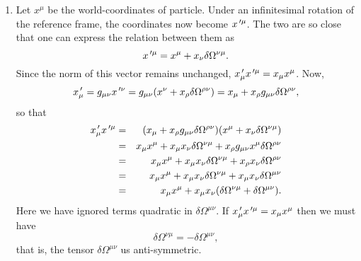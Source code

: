 \begin{enumerate}
\item Let $x^\mu$ be the world-coordinates of particle. Under an infinitesimal 
rotation of the reference frame, the coordinates now become $x^{{\,\prime}\mu}$. The 
two are so close that one can express the relation between them as
\begin{equation}\label{c2e78}
x^{{\,\prime}\mu} = x^\mu + x_\nu\delta\Omega^{\nu\mu}.
\end{equation}
Since the norm of this vector remains unchanged, $x^{\,\prime}_\mu x^{{\,\prime}\mu} = x_\mu 
x^\mu$. Now,
\[
x^{\,\prime}_\mu = 
g_{\mu\nu}x^{{\,\prime}\nu} = g_{\mu\nu}(x^\nu + x_\rho \delta\Omega^{\rho\nu})
= x_\mu + x_\rho g_{\mu\nu}\delta\Omega^{\rho\nu},
\]
so that
\begin{eqnarray*}
x^{\,\prime}_\mu x^{{\,\prime}\mu} &=& 
 (x_\mu + x_\rho g_{\mu\nu}\delta\Omega^{\rho\nu})(x^\mu + 
x_\nu\delta\Omega^{\nu\mu}) \\
 &=& x_\mu x^\mu + x_\mu x_\nu \delta\Omega^{\nu\mu} + x_\rho g_{\mu\nu}x^\mu 
 \delta\Omega^{\rho\nu} \\
 &=& x_\mu x^\mu + x_\mu x_\nu \delta\Omega^{\nu\mu} + x_\rho x_\nu\delta
 \Omega^{\rho\nu} \\
 &=& x_\mu x^\mu + x_\mu x_\nu \delta\Omega^{\nu\mu} + x_\mu x_\nu\delta
 \Omega^{\mu\nu} \\
 &=& x_\mu x^\mu + x_\mu x_\nu (\delta\Omega^{\nu\mu} + \delta \Omega^{\mu\nu}).
\end{eqnarray*}
Here we have ignored terms quadratic in $\delta\Omega^{\mu\nu}$.
If $x^{\,\prime}_\mu x^{{\,\prime}\mu} = x_\mu x^\mu$ then we must have
\begin{equation}\label{c2e79}
\delta\Omega^{\nu\mu} = -\delta \Omega^{\mu\nu},
\end{equation}
that is, the tensor $\delta\Omega^{\mu\nu}$ us anti-symmetric.


\end{enumerate}
